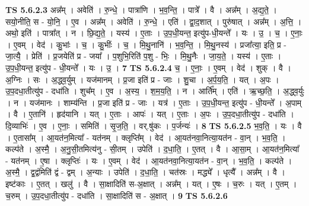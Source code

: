 \documentclass[17pt]{extarticle}
\begin{document}
                  \newline
                                \textbf{ TS 5.6.2.3} \newline
                  अन्न᳚म् । अवेति॑ । रु॒न्धे॒ । पात्रा॑णि । भ॒व॒न्ति॒ । पात्रे᳚ । वै । अन्न᳚म् । अ॒द्य॒ते॒ । सयो॒नीति॒ स - यो॒नि॒ । ए॒व । अन्न᳚म् । अवेति॑ । रु॒न्धे॒ । एति॑ । द्वा॒द॒शात् । पुरु॑षात् । अन्न᳚म् । अ॒त्ति॒ । अथो॒ इति॑ । पात्रा᳚त् । न । छि॒द्य॒ते॒ । यस्य॑ । ए॒ताः । उ॒प॒धी॒यन्त॒ इत्यु॑प-धी॒यन्ते᳚ । यः । उ॒ । च॒ । ए॒नाः॒ । ए॒वम् । वेद॑ । कु॒भांः । च॒ । कु॒भींः । च॒ । मि॒थु॒नानि॑ । भ॒व॒न्ति॒ । मि॒थु॒नस्य॑ । प्रजा᳚त्या॒ इति॒ प्र - जा॒त्यै॒ । प्रेति॑ । प्र॒जयेति॑ प्र - जया᳚ । प॒शुभि॒रिति॑ प॒शु - भिः॒ । मि॒थु॒नैः । जा॒य॒ते॒ । यस्य॑ । ए॒ताः । उ॒प॒धी॒यन्त॒ इत्यु॑प - धी॒यन्ते᳚ । यः । उ॒ । \textbf{  7} \newline
                  \newline
                                \textbf{ TS 5.6.2.4} \newline
                  च॒ । ए॒नाः॒ । ए॒वम् । वेद॑ । शुक् । वै । अ॒ग्निः । सः । अ॒द्ध्व॒र्युम् । यज॑मानम् । प्र॒जा इति॑ प्र - जाः । शु॒चा । अ॒र्प॒य॒ति॒ । यत् । अ॒पः । उ॒प॒दधा॒तीत्यु॑प - दधा॑ति । शुच᳚म् । ए॒व । अ॒स्य॒ । श॒म॒य॒ति॒ । न । आर्ति᳚म् । एति॑ । ऋ॒च्छ॒ति॒ । अ॒द्ध्व॒र्युः । न । यज॑मानः । शाम्य॑न्ति । प्र॒जा इति॑ प्र - जाः । यत्र॑ । ए॒ताः । उ॒प॒धी॒यन्त॒ इत्यु॑प - धी॒यन्ते᳚ । अ॒पाम् । वै । ए॒तानि॑ । हृद॑यानि । यत् । ए॒ताः । आपः॑ । यत् । ए॒ताः । अ॒पः । उ॒प॒दधा॒तीत्यु॑प - दधा॑ति । दि॒व्याभिः॑ । ए॒व । ए॒नाः॒ । समिति॑ । सृ॒ज॒ति॒ । वर्.षु॑कः । प॒र्जन्यः॑ । \textbf{  8} \newline
                  \newline
                                \textbf{ TS 5.6.2.5} \newline
                  भ॒व॒ति॒ । यः । वै । ए॒तासा᳚म् । आ॒यत॑न॒मित्या᳚ - यत॑नम् । क्लृप्ति᳚म् । वेद॑ । आ॒यत॑नवा॒नित्या॒यत॑न - वा॒न् । भ॒व॒ति॒ । कल्प॑ते । अ॒स्मै॒ । अ॒नु॒सी॒तमित्य॑नु - सी॒तम् । उपेति॑ । द॒धा॒ति॒ । ए॒तत् । वै । आ॒सा॒म् । आ॒यत॑न॒मित्या᳚ - यत॑नम् । ए॒षा । क्लृप्तिः॑ । यः । ए॒वम् । वेद॑ । आ॒यत॑नवा॒नित्या॒यत॑न - वा॒न् । भ॒व॒ति॒ । कल्प॑ते । अ॒स्मै॒ । द्व॒द्वंमिति॑ द्वं - द्वम् । अ॒न्याः । उपेति॑ । द॒धा॒ति॒ । चत॑स्रः । मद्ध्ये᳚ । धृत्यै᳚ । अन्न᳚म् । वै । इष्ट॑काः । ए॒तत् । खलु॑ । वै । सा॒क्षादिति॑ स-अ॒क्षात् । अन्न᳚म् । यत् । ए॒षः । च॒रुः । यत् । ए॒तम् । च॒रुम् । उ॒प॒दधा॒तीत्यु॑प - दधा॑ति । सा॒क्षादिति॑ स - अ॒क्षात् । \textbf{  9} \newline
                  \newline
                                \textbf{ TS 5.6.2.6} \newline
\end{document}
